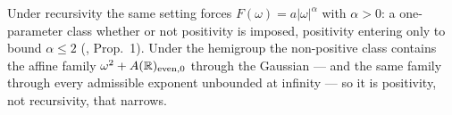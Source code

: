 Under recursivity the same setting forces $F(\omega) = a|\omega|^\alpha$ with $\alpha > 0$: a
one-parameter class whether or not positivity is imposed, positivity entering only to bound
$\alpha \le 2$ (, Prop.~1). Under the hemigroup the non-positive
class contains the affine family $\omega^2 + A(\mathbb{R})_{\mathrm{even},0}$ through the Gaussian ---
and the same family through every admissible exponent unbounded at infinity --- so it is
positivity, not recursivity, that narrows.
